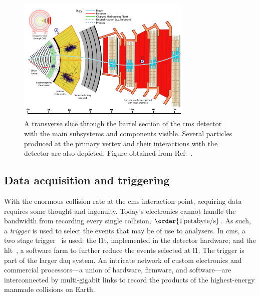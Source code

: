 \begin{figure}[htbp]
    \centering
    \includegraphics[width=0.75\textwidth]{figures/Transverse_slice_CMS.pdf}
    \caption[A transverse slice through the barrel section of the CMS detector with the main subsystems and components visible]{A transverse slice through the barrel section of the \acrshort{cms} detector with the main subsystems and components visible. Several particles produced at the primary vertex and their interactions with the detector are also depicted. Figure obtained from Ref.~.}
    \label{fig:detector_cms_transverse}
\end{figure}





\subsection{Data acquisition and triggering}
\label{subsec:cms_recording_data}

With the enormous collision rate at the \acrshort{cms} interaction point, acquiring data requires some thought and ingenuity. Today's electronics cannot handle the bandwidth from recording every single collision, $\order{\text{1\,petabyte/s}}$. As such, a \emph{trigger} is used to select the events that may be of use to analysers. In \acrshort{cms}, a two stage trigger~\cite{Bayatyan:706847} is used: the \acrfull{l1t}, implemented in the detector hardware; and the \acrfull{hlt}~\cite{Cittolin:578006}, a software farm to further reduce the events selected at \acrlong{l1}. The trigger is part of the larger \acrfull{daq} system. An intricate network of custom electronics and commercial processors---a union of hardware, firmware, and software---are interconnected by multi-gigabit links to record the products of the highest-energy manmade collisions on Earth.


